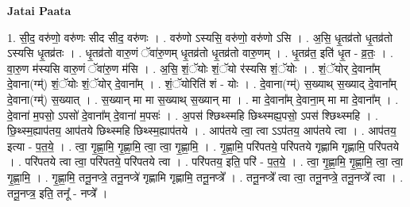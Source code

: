 \documentclass[17pt]{extarticle}
\begin{document}
\textbf{Jatai Paata} \newline

1. सी॒द॒ वरु॑णो॒ वरु॑णः सीद सीद॒ वरु॑णः । . वरु॑णो ऽस्यसि॒ वरु॑णो॒ वरु॑णो ऽसि । . अ॒सि॒ धृ॒तव्र॑तो धृ॒तव्र॑तो ऽस्यसि धृ॒तव्र॑तः । . धृ॒तव्र॑तो वारु॒णं ॅवा॑रु॒णम् धृ॒तव्र॑तो धृ॒तव्र॑तो वारु॒णम् । . धृ॒तव्र॑त॒ इति॑ धृ॒त - व्र॒तः॒ । . वा॒रु॒ण म॑स्यसि वारु॒णं ॅवा॑रु॒ण म॑सि । . अ॒सि॒ शं॒ॅयोः शं॒ॅयो र॑स्यसि शं॒ॅयोः । . शं॒ॅयोर् दे॒वाना᳚म् दे॒वाना(ग्म्॑) शं॒ॅयोः शं॒ॅयोर् दे॒वाना᳚म् । . शं॒ॅयोरिति॑ शं - योः । . दे॒वाना(ग्म्॑) स॒ख्याथ् स॒ख्याद् दे॒वाना᳚म् दे॒वाना(ग्म्॑) स॒ख्यात् । . स॒ख्यान् मा मा स॒ख्याथ् स॒ख्यान् मा । . मा दे॒वाना᳚म् दे॒वाना॒म् मा मा दे॒वाना᳚म् । . दे॒वाना॑ म॒पसो॒ ऽपसो॑ दे॒वाना᳚म् दे॒वाना॑ म॒पसः॑ । . अ॒पस॑ श्छिथ्स्महि छिथ्स्मह्य॒पसो॒ ऽपस॑ श्छिथ्स्महि । . छि॒थ्स्म॒ह्याप॑तय॒ आप॑तये छिथ्स्महि छिथ्स्म॒ह्याप॑तये । . आप॑तये त्वा॒ त्वा ऽऽप॑तय॒ आप॑तये त्वा । . आप॑तय॒ इत्या - प॒त॒ये॒ । . त्वा॒ गृ॒ह्णा॒मि॒ गृ॒ह्णा॒मि॒ त्वा॒ त्वा॒ गृ॒ह्णा॒मि॒ । . गृ॒ह्णा॒मि॒ परि॑पतये॒ परि॑पतये गृह्णामि गृह्णामि॒ परि॑पतये । . परि॑पतये त्वा त्वा॒ परि॑पतये॒ परि॑पतये त्वा । . परि॑पतय॒ इति॒ परि॑ - प॒त॒ये॒ । . त्वा॒ गृ॒ह्णा॒मि॒ गृ॒ह्णा॒मि॒ त्वा॒ त्वा॒ गृ॒ह्णा॒मि॒ । . गृ॒ह्णा॒मि॒ तनू॒नप्त्रे॒ तनू॒नप्त्रे॑ गृह्णामि गृह्णामि॒ तनू॒नप्त्रे᳚ । . तनू॒नप्त्रे᳚ त्वा त्वा॒ तनू॒नप्त्रे॒ तनू॒नप्त्रे᳚ त्वा । . तनू॒नप्त्र॒ इति॒ तनू᳚ - नप्त्रे᳚ । \newline
\end{document}
